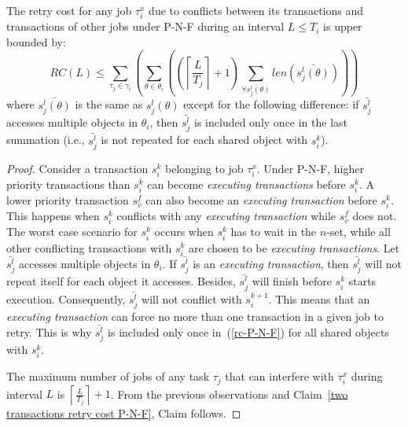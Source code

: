 \begin{clm}
The retry cost for any job $\tau_{i}^{x}$ due to conflicts between its transactions and transactions of other jobs under P-N-F during an interval $L\le T_{i}$ is upper bounded by:
\begin{equation}
RC(L)\le\sum_{\tau_{j}\in\gamma_{i}}\left(\sum_{\theta\in\theta_{i}}\left(\left(\left\lceil \frac{L}{T_{j}}\right\rceil +1\right)\sum_{\bar{\forall s_{j}^{l}(\theta)}}len\left(\bar{s_{j}^{l}(\theta)}\right)\right)\right)\label{rc-P-N-F}
\end{equation}
where $\bar{s_{j}^{l}(\theta)}$ is the same as $s_{j}^{l}(\theta)$ except for the following difference:
 if $\bar{s_{j}^{l}}$ accesses multiple objects in $\theta_{i}$,
then $\bar{s_{j}^{l}}$ is included only once in the last summation (i.e., $\bar{s_j^l}$ is not repeated for each shared object with $s_i^k$).
\end{clm}
\begin{proof}
Consider a transaction $s_{i}^{k}$ belonging to job $\tau_{i}^{x}$. Under P-N-F, higher priority transactions than $s_i^k$ can become \emph{executing transactions} before $s_i^k$. A lower priority transaction $s_v^f$ can also become an \emph{executing transaction} before $s_i^k$. This happens when $s_i^k$ conflicts with any \emph{executing transaction} while $s_v^f$ does not. The worst case scenario for $s_{i}^{k}$ occurs when $s_i^k$ has to wait in the $n$-set, while all other conflicting transactions with $s_i^k$ are chosen to be \emph{executing transactions}. 
Let $\bar{s_j^l}$ accesses multiple objects in $\theta_i$. If $\bar{s_j^l}$ is an \emph{executing transaction}, then $\bar{s_j^l}$ will not repeat itself for each object it accesses. Besides, $\bar{s_j^l}$ will finish before $s_i^k$ starts execution. Consequently, $\bar{s_j^l}$ will not conflict with $s_i^{k+1}$. This means that an \emph{executing transaction} can force no more than one transaction in a given job to retry. This is why $\bar{s_j^l}$ is included only once in~(\ref{rc-P-N-F}) for all shared objects with $s_i^k$.

The maximum number of jobs of any task $\tau_{j}$ that can interfere with $\tau_{i}^{x}$ during interval $L$ is $\left\lceil \frac{L}{T_{j}}\right\rceil +1$. From  the previous observations and Claim~\ref{two transactions retry cost P-N-F}, Claim follows.
\end{proof}

